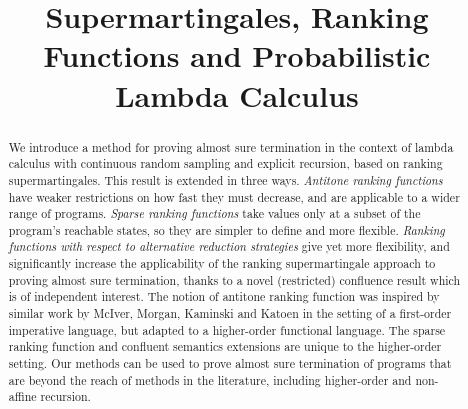 \documentclass[conference]{IEEEtran}
\begin{document}
\title{Supermartingales, Ranking Functions and Probabilistic Lambda Calculus}


\maketitle

\begin{abstract}
We introduce a method for proving almost sure termination in the context of lambda calculus with continuous random sampling and explicit recursion, based on ranking supermartingales. 
This result is extended in three ways. 
\emph{Antitone ranking functions} have weaker restrictions on how fast they must decrease, and are applicable to a wider range of programs. 
\emph{Sparse ranking functions} take values only at a subset of the program's reachable states, so they are simpler to define and more flexible. 
\emph{Ranking functions with respect to alternative reduction strategies} give yet more flexibility, and significantly increase the applicability of the ranking supermartingale approach to proving almost sure termination, thanks to a novel (restricted) confluence result which is of independent interest.
The notion of antitone ranking function was inspired by similar work by McIver, Morgan, Kaminski and Katoen in the setting of a first-order imperative language, but adapted to a higher-order functional language.
The sparse ranking function and confluent semantics extensions are unique to the higher-order setting.
Our methods can be used to prove almost sure termination of programs that are beyond the reach of methods in the literature, including higher-order and non-affine recursion.
\end{abstract}

\IEEEpeerreviewmaketitle

















%


\end{document}
